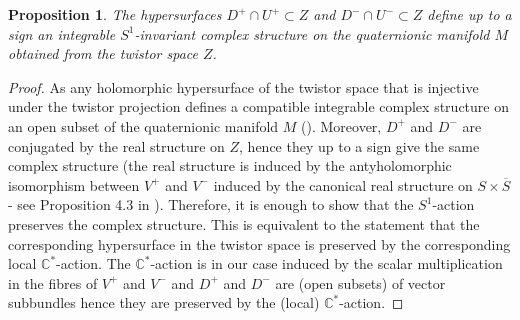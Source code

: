 \documentclass{amsart}
\newtheorem{prop}{Proposition}[section]
\begin{document}
\begin{prop}\label{main}
 The hypersurfaces $D^+\cap U^+\subset Z$ and $D^-\cap U^-\subset Z$ define up to a sign an integrable $S^1$-invariant complex structure on the quaternionic manifold $M$ obtained from the twistor space $Z$.
\end{prop}
\begin{proof}
  As any holomorphic hypersurface of the twistor space that is injective under the twistor projection defines a compatible integrable complex structure on an open subset of the quaternionic manifold $M$  (\cite{AMP}). Moreover, $D^+$ and $D^-$ are conjugated by the real structure on $Z$, hence they  up to a sign give the same complex structure (the real structure is induced by the antyholomorphic isomorphism between $V^+$ and $V^-$  induced by the canonical real structure on $S\times\overline{S}$ - see Proposition 4.3 in \cite{BC}). Therefore, it is enough to show that the $S^1$-action preserves the complex structure. This is equivalent to the statement that the corresponding hypersurface in the twistor space is preserved by the corresponding local $\mathbb{C}^*$-action. The $\mathbb{C}^*$-action is in our case induced by the scalar multiplication in the fibres of $V^+$ and $V^-$ and $D^+$ and $D^-$ are (open subsets) of vector subbundles hence they are preserved by the (local)   $\mathbb{C}^*$-action.
\end{proof}
\end{document}

